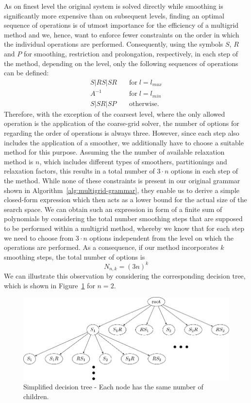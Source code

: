 As on finest level the original system is solved directly while smoothing is significantly more expensive than on subsequent levels, finding an optimal sequence of operations is of utmost importance for the efficiency of a multigrid method and we, hence, want to enforce fewer constraints on the order in which the individual operations are performed.
Consequently, using the symbols $S$, $R$ and $P$ for smoothing, restriction and prolongation, respectively, in each step of the method, depending on the level, only the following sequences of operations can be defined:
\begin{align*}
	S | RS | SR & \quad \text{for} \; l = l_{max} \\
	A^{-1} & \quad \text{for} \; l = l_{min} \\
	S | SR | SP & \quad \text{otherwise}.
\end{align*}
Therefore, with the exception of the coarsest level, where the only allowed operation is the application of the coarse-grid solver, the number of options for regarding the order of operations is always three.
However, since each step also includes the application of a smoother, we additionally have to choose a suitable method for this purpose.
Assuming the the number of available relaxation method is $n$, which includes different types of smoothers, partitionings and relaxation factors, this results in a total number of $3 \cdot n$ options in each step of the method. 
While none of these constraints is present in our original grammar shown in Algorithm~\ref{alg:multigrid-grammar}, they enable us to derive a simple closed-form expression which then acts as a lower bound for the actual size of the search space.
We can obtain such an expression in form of a finite sum of polynomials by considering the total number smoothing steps that are supposed to be performed within a multigrid method, whereby we know that for each step we need to choose from $3 \cdot n$ options independent from the level on which the operations are performed.
As a consequence, if our method incorporates $k$ smoothing steps, the total number of options is 
\begin{equation}
	N_{n,k} = (3 n)^k
	\label{eq:simplified-number-of-options}
\end{equation}
We can illustrate this observation by considering the corresponding decision tree, which is shown in Figure~\ref{fig:decision-tree} for $n = 2$.
\begin{figure}
	\centering
	\includegraphics[width=\textwidth]{figures/trees/decision_tree_annotated.pdf}
	\caption{Simplified decision tree - Each node has the same number of children.}
	\label{fig:decision-tree}
\end{figure}
